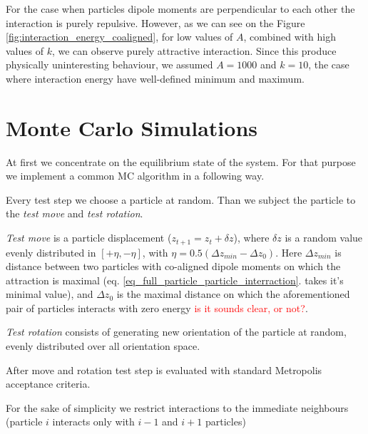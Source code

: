 \documentclass[12pt,a4paper]{article}
\begin{document}
For the case when particles dipole moments are perpendicular to each other the interaction is purely repulsive. However, as we can see on the Figure \ref{fig:interaction_energy_coaligned}, for low values of $A$, combined with high values of $k$, we can observe purely attractive interaction. Since this produce physically uninteresting behaviour, we assumed $A = 1000$ and $k = 10$, the case where interaction energy have well-defined minimum and maximum.


\section{Monte Carlo Simulations}

At first we concentrate on the equilibrium state of the system. For that purpose we implement a common MC algorithm in a following way.

Every test step we choose a particle at random. Than we subject the particle to the \emph{test move} and \emph{test rotation}.

\emph{Test move} is a particle displacement ($z_{t+1} = z_t + \delta z$), where $\delta z$ is a random value evenly distributed in $[+\eta, -\eta]$, with $\eta = 0.5 (\Delta z_{min} - \Delta z_0)$. Here $\Delta z_{min}$ is distance between two particles with co-aligned dipole moments on which the attraction is maximal (eq. \ref{eq_full_particle_particle_interraction}. takes it's minimal value), and $\Delta z_0$ is the maximal distance on which the aforementioned pair of particles interacts with zero energy \textcolor{red}{is it sounds clear, or not?}.

\emph{Test rotation} consists of generating new orientation of the particle at random, evenly distributed over all orientation space.

After move and rotation test step is evaluated with standard Metropolis acceptance criteria.

For the sake of simplicity we restrict interactions to the immediate neighbours (particle $i$ interacts only with $i-1$ and $i+1$ particles) 
\end{document}
